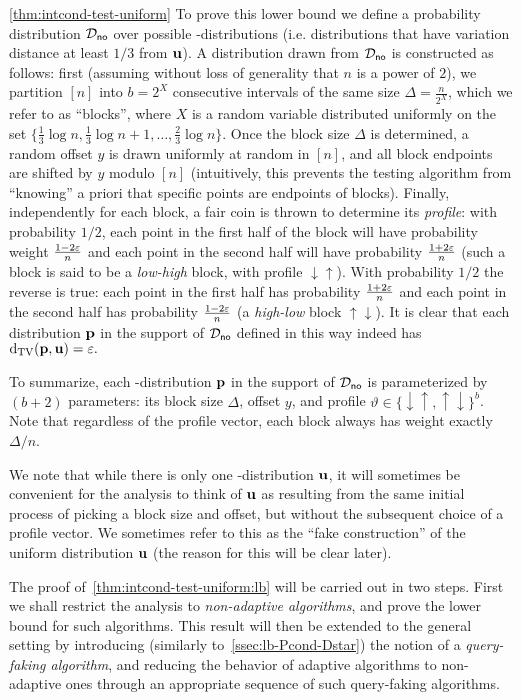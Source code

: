 \begin{proofof}{\cref{thm:intcond-test-uniform}}
To prove this lower bound we define a probability distribution
$\mathcal{D}_{\textsf{no}}$ over possible \no-distributions (i.e.
distributions that have variation distance at least $1/3$ from $\mathbf{u}$).
A distribution drawn from $\mathcal{D}_{\textsf{no}}$ is constructed
as follows:  first (assuming without loss of generality that $n$ is a power of $2$), we partition $[n]$ into $b=2^X$ consecutive
intervals of the same size $\Delta=\frac{n}{2^X}$, which we refer to as
``blocks'', where $X$ is a random variable distributed uniformly on the
set \mbox{$\{\frac{1}{3}\log n, \frac{1}{3}\log n + 1, \dots,
\frac{2}{3}\log n\}$}. Once the block size $\Delta$ is determined, a random
offset $y$ is drawn uniformly at random in $[n]$, and all block
endpoints are shifted by $y$ modulo $[n]$ (intuitively, this prevents
the testing algorithm from ``knowing'' a priori that
specific points are endpoints of blocks).
Finally, independently for each block, a fair coin is thrown to determine its
\emph{profile}: with probability $1/2$, each point in the first half
of the block
will have probability weight $\frac{1-2\varepsilon}{n}$ and each
point in the second half will have probability
$\frac{1+2\varepsilon}{n}$ (such a block is said to be
a \emph{low-high} block, with profile
$\downarrow\uparrow$).  With probability $1/2$ the reverse is true:
each point in the first half has probability ${\frac {1+2\varepsilon} n}$
and each point in the second half has probability ${\frac {1-2\varepsilon} n}$
(a \emph{high-low} block $\uparrow\downarrow$).
It is clear that each distribution $\mathbf{p}$ in the support of
$\mathcal{D}_{\textsf{no}}$ defined in this way indeed has
$\operatorname{d}_{\rm{TV}}(\mathbf{p},\mathbf{u}) = \varepsilon.$

To summarize, each \no-distribution $\mathbf{p}$ in the support of
$\mathcal{D}_{\textsf{no}}$ is parameterized
by $(b+2)$ parameters: its block size $\Delta$, offset $y$, and profile
$\vartheta\in\{\downarrow\uparrow,\uparrow\downarrow\}^b$. Note
that regardless of the profile vector,
each block always has weight exactly $\Delta/n$.

We note that while there is only one \yes-distribution
$\mathbf{u}$, it will sometimes be convenient for the analysis to think of
$\mathbf{u}$  as resulting from the same initial process of picking a block size and
offset, but without the subsequent choice of a profile vector.
We sometimes refer to this as the ``fake construction'' of the
uniform distribution $\mathbf{u}$ (the reason for this will be clear later).

The proof of~\cref{thm:intcond-test-uniform:lb} will be carried
out in two steps.  First we shall restrict the analysis to
\emph{non-adaptive algorithms}, and prove the lower bound for such algorithms.
This result will then be extended to the general setting by introducing
(similarly to~\cref{ssec:lb-Pcond-Dstar}) the notion of a
\emph{query-faking algorithm}, and reducing the behavior of adaptive
algorithms to non-adaptive ones through an appropriate sequence of
such query-faking algorithms.


\end{proofof}

